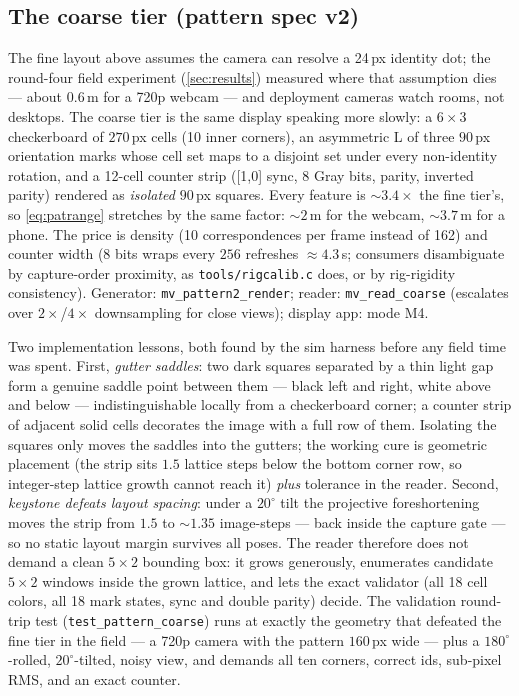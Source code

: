 \documentclass[11pt]{article}
\theoremstyle{definition}
\newcommand{\code}[1]{\texttt{#1}}
\begin{document}
\subsection{The coarse tier (pattern spec v2)}
\label{sec:coarsetier}

The fine layout above assumes the camera can resolve a 24\,px identity
dot; the round-four field experiment (\autoref{sec:results}) measured
where that assumption dies --- about $0.6$\,m for a 720p webcam ---
and deployment cameras watch rooms, not desktops. The coarse tier is
the same display speaking more slowly: a $6\times3$ checkerboard of
$270$\,px cells (10 inner corners), an asymmetric L of three $90$\,px
orientation marks whose cell set maps to a disjoint set under every
non-identity rotation, and a 12-cell counter strip ([1,0] sync, 8 Gray
bits, parity, inverted parity) rendered as \emph{isolated} $90$\,px
squares. Every feature is $\sim$$3.4\times$ the fine tier's, so
\eqref{eq:patrange} stretches by the same factor: $\sim$$2$\,m for the
webcam, $\sim$$3.7$\,m for a phone. The price is density (10
correspondences per frame instead of 162) and counter width (8 bits
wraps every $256$ refreshes $\approx4.3$\,s; consumers disambiguate by
capture-order proximity, as \code{tools/rigcalib.c} does, or by
rig-rigidity consistency). Generator: \code{mv\_pattern2\_render};
reader: \code{mv\_read\_coarse} (escalates over $2\times$/$4\times$
downsampling for close views); display app: mode M4.

Two implementation lessons, both found by the sim harness before any
field time was spent. First, \emph{gutter saddles}: two dark squares
separated by a thin light gap form a genuine saddle point between them
--- black left and right, white above and below --- indistinguishable
locally from a checkerboard corner; a counter strip of adjacent solid
cells decorates the image with a full row of them. Isolating the
squares only moves the saddles into the gutters; the working cure is
geometric placement (the strip sits $1.5$ lattice steps below the
bottom corner row, so integer-step lattice growth cannot reach it)
\emph{plus} tolerance in the reader. Second, \emph{keystone defeats
layout spacing}: under a $20^\circ$ tilt the projective foreshortening
moves the strip from $1.5$ to $\sim$$1.35$ image-steps --- back inside
the capture gate --- so no static layout margin survives all poses.
The reader therefore does not demand a clean $5\times2$ bounding box:
it grows generously, enumerates candidate $5\times2$ windows inside
the grown lattice, and lets the exact validator (all 18 cell colors,
all 18 mark states, sync and double parity) decide. The validation
round-trip test (\code{test\_pattern\_coarse}) runs at exactly the
geometry that defeated the fine tier in the field --- a 720p camera
with the pattern $160$\,px wide --- plus a $180^\circ$-rolled,
$20^\circ$-tilted, noisy view, and demands all ten corners, correct
ids, sub-pixel RMS, and an exact counter.
\end{document}
